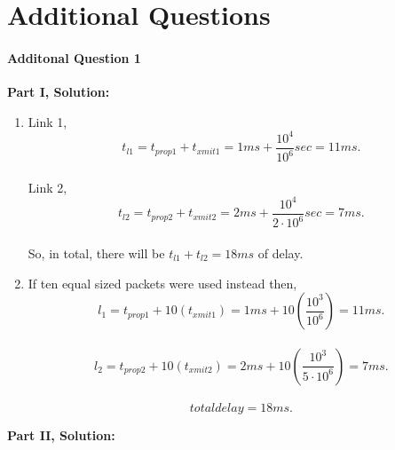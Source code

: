 \documentclass[12pt]{article}
\begin{document}
\section{Additional Questions}

\paragraph{Additonal Question 1\\}
\textbf{Part I, Solution: }
\begin{enumerate}
\item Link 1,\\
$$t_{l1} = t_{prop1} + t_{xmit1} = 1ms + \frac{10^4}{10^6}sec = 11ms.$$\\
Link 2,\\
$$t_{l2} = t_{prop2} + t_{xmit2} = 2ms + \frac{10^4}{2\cdot 10^6}sec = 7ms.$$\\
So, in total, there will be $t_{l1} + t_{l2} = 18ms$ of delay.
\item If ten equal sized packets were used instead then,\\
$$l_1 = t_{prop1} + 10( t_{xmit1} ) = 1 ms + 10( \frac{10^3}{10^6} ) = 11ms.$$\\
$$l_2 = t_{prop2}  + 10(t_{xmit2} ) = 2ms + 10( \frac{10^3}{5\cdot10^6} )= 7ms.$$\\
$$total delay = 18 ms.$$
\end{enumerate}
\textbf{Part II, Solution:\\}
\end{document}
